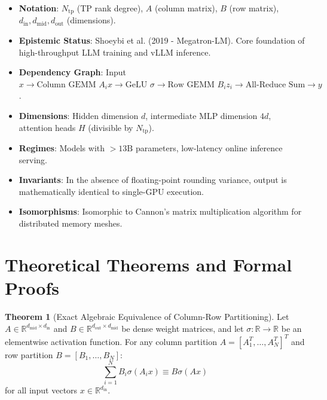 \documentclass[11pt,a4paper]{article}
\theoremstyle{definition}
\newtheorem{theorem}{\textbf{Theorem}}[section]
\begin{document}
\begin{itemize}
    \item \textbf{Notation}: $N_{\text{tp}}$ (TP rank degree), $A$ (column matrix), $B$ (row matrix), $d_{\text{in}}, d_{\text{mid}}, d_{\text{out}}$ (dimensions).
    \item \textbf{Epistemic Status}: Shoeybi et al. (2019 - Megatron-LM). Core foundation of high-throughput LLM training and vLLM inference.
    \item \textbf{Dependency Graph}: Input $x \to \text{Column GEMM } A_i x \to \text{GeLU } \sigma \to \text{Row GEMM } B_i z_i \to \text{All-Reduce Sum} \to y$.
    \item \textbf{Dimensions}: Hidden dimension $d$, intermediate MLP dimension $4d$, attention heads $H$ (divisible by $N_{\text{tp}}$).
    \item \textbf{Regimes}: Models with $>13\text{B}$ parameters, low-latency online inference serving.
    \item \textbf{Invariants}: In the absence of floating-point rounding variance, output is mathematically identical to single-GPU execution.
    \item \textbf{Isomorphisms}: Isomorphic to Cannon's matrix multiplication algorithm for distributed memory meshes.
\end{itemize}

\section{Theoretical Theorems and Formal Proofs}

\begin{theorem}[Exact Algebraic Equivalence of Column-Row Partitioning]
Let $A \in \mathbb{R}^{d_{\text{mid}} \times d_{\text{in}}}$ and $B \in \mathbb{R}^{d_{\text{out}} \times d_{\text{mid}}}$ be dense weight matrices, and let $\sigma: \mathbb{R} \to \mathbb{R}$ be an elementwise activation function. For any column partition $A = [A_1^T, \dots, A_N^T]^T$ and row partition $B = [B_1, \dots, B_N]$:
{\boldmath
\begin{equation}
\sum_{i=1}^N B_i \sigma(A_i x) \equiv B \sigma(A x)
\end{equation}
}
for all input vectors $x \in \mathbb{R}^{d_{\text{in}}}$.
\end{theorem}
\end{document}
